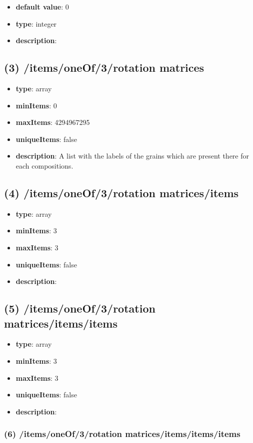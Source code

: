 \begin{itemize}[leftmargin=4em]\item {\bf default value}: 0
\item {\bf type}: integer
\item {\bf description}: 
\end{itemize}\subsection{(3) /items/oneOf/3/rotation matrices}
\begin{itemize}[leftmargin=3em]\item {\bf type}: array
\item {\bf minItems}: 0
\item {\bf maxItems}: 4294967295
\item {\bf uniqueItems}: false
\item {\bf description}: A list with the labels of the grains which are present there for each compositions.
\end{itemize}\subsection{(4) /items/oneOf/3/rotation matrices/items}
\begin{itemize}[leftmargin=4em]\item {\bf type}: array
\item {\bf minItems}: 3
\item {\bf maxItems}: 3
\item {\bf uniqueItems}: false
\item {\bf description}: 
\end{itemize}\subsection{(5) /items/oneOf/3/rotation matrices/items/items}
\begin{itemize}[leftmargin=5em]\item {\bf type}: array
\item {\bf minItems}: 3
\item {\bf maxItems}: 3
\item {\bf uniqueItems}: false
\item {\bf description}: 
\end{itemize}\subsubsection{(6) /items/oneOf/3/rotation matrices/items/items/items}
